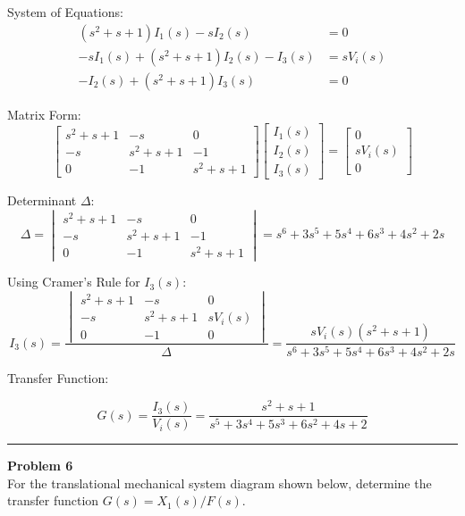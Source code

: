 \documentclass[11pt]{article}
\begin{document}
{System of Equations:}
\[
\begin{aligned}
(s^2 + s + 1)I_1(s) - sI_2(s) &= 0 \\
-sI_1(s) + (s^2 + s + 1)I_2(s) - I_3(s) &= sV_i(s) \\
-I_2(s) + (s^2 + s + 1)I_3(s) &= 0
\end{aligned}
\]

{Matrix Form:}
\[
\begin{bmatrix}
s^2 + s + 1 & -s & 0 \\
-s & s^2 + s + 1 & -1 \\
0 & -1 & s^2 + s + 1
\end{bmatrix}
\begin{bmatrix}
I_1(s) \\ I_2(s) \\ I_3(s)
\end{bmatrix}
=
\begin{bmatrix}
0 \\ sV_i(s) \\ 0
\end{bmatrix}
\]

{Determinant \(\Delta\):}
\[
\Delta =
\begin{vmatrix}
s^2 + s + 1 & -s & 0 \\
-s & s^2 + s + 1 & -1 \\
0 & -1 & s^2 + s + 1
\end{vmatrix}
= s^6 + 3s^5 + 5s^4 + 6s^3 + 4s^2 + 2s
\]

{Using Cramer's Rule for \(I_3(s)\):}
\[
I_3(s) =
\frac{
\begin{vmatrix}
s^2 + s + 1 & -s & 0 \\
-s & s^2 + s + 1 & sV_i(s) \\
0 & -1 & 0
\end{vmatrix}
}
{\Delta}
= \frac{sV_i(s)(s^2 + s + 1)}{s^6 + 3s^5 + 5s^4 + 6s^3 + 4s^2 + 2s}
\]


{Transfer Function:}

\[
\boxed{
G(s) = \frac{I_3(s)}{V_i(s)} = \frac{s^2 + s + 1}{s^5 + 3s^4 + 5s^3 + 6s^2 + 4s + 2}
}
\]

\newpage
  \setcounter{page}{9}  
\noindent\rule{\textwidth}{1pt}
\noindent\textbf{Problem 6} \hfill
\\For the translational mechanical system diagram shown below, determine the transfer function $G(s)=X_1(s)/F(s)$.
\end{document}
